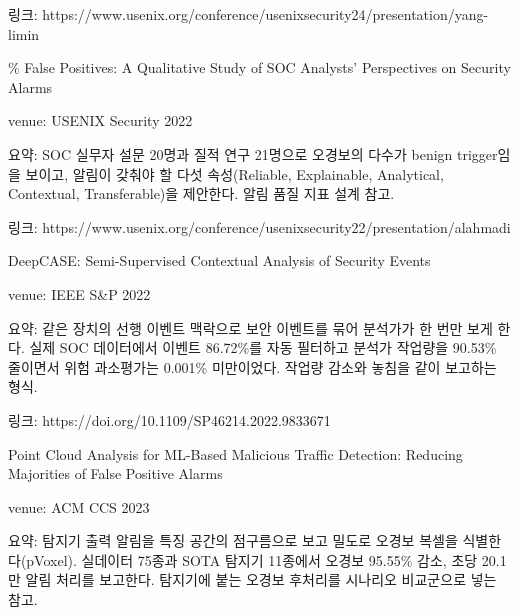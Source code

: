 \par\noindent \textbullet\enspace 링크: https:/\allowbreak{}/\allowbreak{}www.usenix.org/\allowbreak{}conference/\allowbreak{}usenixsecurity24/\allowbreak{}presentation/\allowbreak{}yang-limin


\par\noindent \textbullet{}\% False Positives: A Qualitative Study of SOC Analysts' Perspectives on Security Alarms


\par\noindent \textbullet\enspace venue: USENIX Security 2022


\par\noindent \textbullet\enspace 요약: SOC 실무자 설문 20명과 질적 연구 21명으로 오경보의 다수가 benign trigger임을 보이고, 알림이 갖춰야 할 다섯 속성(Reliable, Explainable, Analytical, Contextual, Transferable)을 제안한다. 알림 품질 지표 설계 참고.


\par\noindent \textbullet\enspace 링크: https:/\allowbreak{}/\allowbreak{}www.usenix.org/\allowbreak{}conference/\allowbreak{}usenixsecurity22/\allowbreak{}presentation/\allowbreak{}alahmadi


\par\noindent \textbullet\enspace DeepCASE: Semi-Supervised Contextual Analysis of Security Events


\par\noindent \textbullet\enspace venue: IEEE S\&P 2022


\par\noindent \textbullet\enspace 요약: 같은 장치의 선행 이벤트 맥락으로 보안 이벤트를 묶어 분석가가 한 번만 보게 한다. 실제 SOC 데이터에서 이벤트 86.72\%를 자동 필터하고 분석가 작업량을 90.53\% 줄이면서 위험 과소평가는 0.001\% 미만이었다. 작업량 감소와 놓침을 같이 보고하는 형식.


\par\noindent \textbullet\enspace 링크: https:/\allowbreak{}/\allowbreak{}doi.org/\allowbreak{}10.1109/\allowbreak{}SP46214.2022.9833671


\par\noindent \textbullet\enspace Point Cloud Analysis for ML-Based Malicious Traffic Detection: Reducing Majorities of False Positive Alarms


\par\noindent \textbullet\enspace venue: ACM CCS 2023


\par\noindent \textbullet\enspace 요약: 탐지기 출력 알림을 특징 공간의 점구름으로 보고 밀도로 오경보 복셀을 식별한다(pVoxel). 실데이터 75종과 SOTA 탐지기 11종에서 오경보 95.55\% 감소, 초당 20.1만 알림 처리를 보고한다. 탐지기에 붙는 오경보 후처리를 시나리오 비교군으로 넣는 참고.


